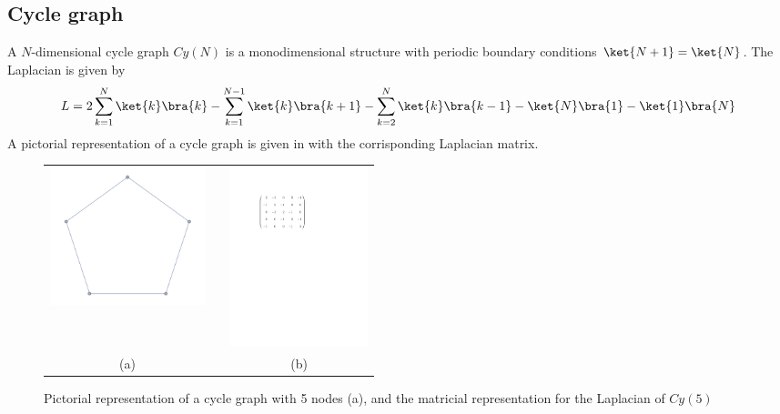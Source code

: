     \subsection{Cycle graph}\label{subsec:cycle graph}
        A $N$-dimensional cycle graph $Cy(N)$ is a monodimensional structure with periodic boundary conditions $\ket{N+1}=\ket{N}$. The Laplacian is given by
        \begin{equation}
            L = 2\sum_{k=1}^{N}\ket{k}\bra{k} - \sum_{k=1}^{N-1}\ket{k}\bra{k+1} - \sum_{k=2}^{N}\ket{k}\bra{k-1}- \ket{N}\bra{1}-\ket{1}\bra{N}
        \end{equation}
        A pictorial representation of a cycle graph is given in  with the corrisponding Laplacian matrix.
        \begin{figure}[htb]
          \centering
          \begin{tabular}{ccc}
            \includegraphics[width=45mm]{./figures/chapter1/cycle} & \hspace{20pt} &\includegraphics[width=40mm]{./figures/chapter1/Laplacian} \\[0.5cm]
          (a)  & & (b) \\[6pt]
          \end{tabular}
          \caption[Pictorial representation of a cycle graph, and matricial representation for the Laplacian]{Pictorial representation of a cycle graph with 5 nodes (a), and the matricial representation for the Laplacian of $Cy(5)$}
          \label{fig:cyclegraph_pictorial_laplacian}
        \end{figure}

